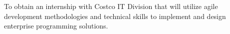 \documentclass[letter,10pt]{article}
\begin{document}
To obtain an internship with Costco IT Division that will utilize agile development methodologies and technical skills to implement and design enterprise programming solutions. 

\end{document}
